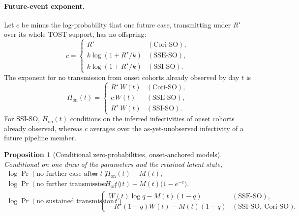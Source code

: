 \documentclass[11pt,a4paper]{article}
\theoremstyle{plain}
\newtheorem{proposition}{Proposition}
\theoremstyle{definition}
\newcommand{\Rreset}{R^{\star}}
\newcommand{\sseso}{SSE-SO}
\newcommand{\ssiso}{SSI-SO}
\newcommand{\coriso}{Cori-SO}
\begin{document}
\paragraph{Future-event exponent.} Let $c$ be minus the log-probability that one future case,
transmitting under $\Rreset$ over its whole TOST support, has no offspring:
\begin{equation}
  c =
  \begin{cases}
    \Rreset & (\text{\coriso}),\\
    k\log\!\left(1+\Rreset/k\right) & (\text{\sseso}),\\
    k\log\!\left(1+\Rreset/k\right) & (\text{\ssiso}).
  \end{cases}
  \label{eq:per-case}
\end{equation}
The exponent for no transmission from onset cohorts already observed by day $t$ is
\begin{equation}
  H_{\mathrm{on}}(t) =
  \begin{cases}
    \Rreset\,W(t) & (\text{\coriso}),\\
    c\,W(t) & (\text{\sseso}),\\
    \Rreset\,W(t) & (\text{\ssiso}).
  \end{cases}
  \label{eq:retained-exponent}
\end{equation}
For \ssiso{}, $H_{\mathrm{on}}(t)$ conditions on the inferred infectivities of onset cohorts
already observed, whereas $c$ averages over the as-yet-unobserved infectivity of a future
pipeline member.

\begin{proposition}[Conditional zero-probabilities, onset-anchored models]
\label{prop:onset}
Conditional on one draw of the parameters and the retained latent state,
\begin{align}
  \log\Pr(\text{no further case after } t) &= -H_{\mathrm{on}}(t) - M(t),
  \label{eq:log-no-case}\\
  \log\Pr(\text{no further transmission after } t)
    &= -H_{\mathrm{on}}(t) - M(t)\bigl(1 - e^{-c}\bigr).
  \label{eq:log-no-transmission}\\
  \log\Pr(\text{no sustained transmission after } t)
    &=
    \begin{cases}
      W(t)\log q-M(t)(1-q) & (\text{\sseso{}}),\\
      -\Rreset(1-q)W(t)-M(t)(1-q) & (\text{\ssiso{}},\ \text{\coriso{}}).
    \end{cases}
  \label{eq:log-no-sustained}
\end{align}
\end{proposition}
\end{document}

